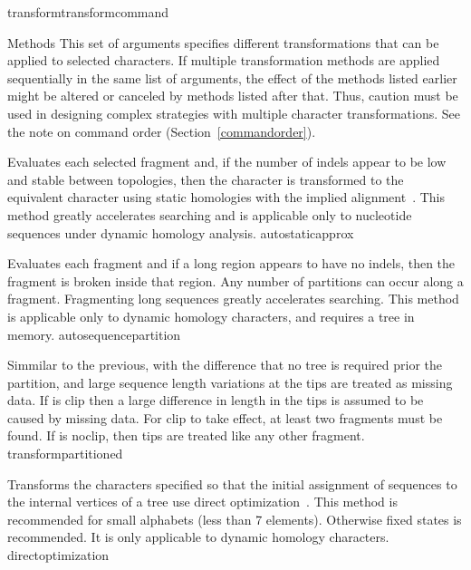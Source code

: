 \begin{command}{transform}{transformcommand}
\begin{arguments}
           \begin{argumentgroup}{Methods}
            This set of arguments specifies different transformations that can be applied
            to selected characters. If multiple transformation methods are applied
            sequentially in the same list of arguments, the effect of the methods listed
            earlier might be altered or canceled by methods listed after that. Thus, caution
            must be used in designing complex strategies with multiple character
            transformations. See the note on command order (Section~\ref{commandorder}).

            {Evaluates each selected fragment and, if the number of indels
            appear to be low and stable between topologies, then the character
            is transformed to the equivalent character using static homologies
            with the implied alignment~\cite{wheeler2003}.
            This method greatly accelerates searching and is applicable only to nucleotide sequences under dynamic homology analysis.}
            {autostaticapprox}

            {Evaluates each fragment and if a long region appears 
            to have no indels, then the fragment is broken inside that region.
            Any number of partitions can occur along a fragment. Fragmenting
            long sequences greatly accelerates searching. This method is
            applicable only to dynamic homology characters, and requires a tree
            in memory.}
            {autosequencepartition}

            {Simmilar to the previous, with the difference that no tree is
            required prior the partition, and large sequence length variations
            at the tips are treated as missing data. If \poylident is clip then
            a large difference in length in the tips is assumed to be caused by
            missing data. For clip to take effect, at least two fragments must
            be found. If \poylident is noclip, then tips are treated like
            any other fragment.}
            {transformpartitioned}


          {Transforms the characters specified so that the initial assignment of sequences to 
          the internal vertices of a tree use direct
          optimization~\cite{wheeler1996}. This method is recommended for small
          alphabets (less than 7 elements). Otherwise fixed states is
          recommended. It is only applicable to dynamic homology
          characters.}
          {directoptimization}


\end{argumentgroup}
\end{arguments}
\end{command}
